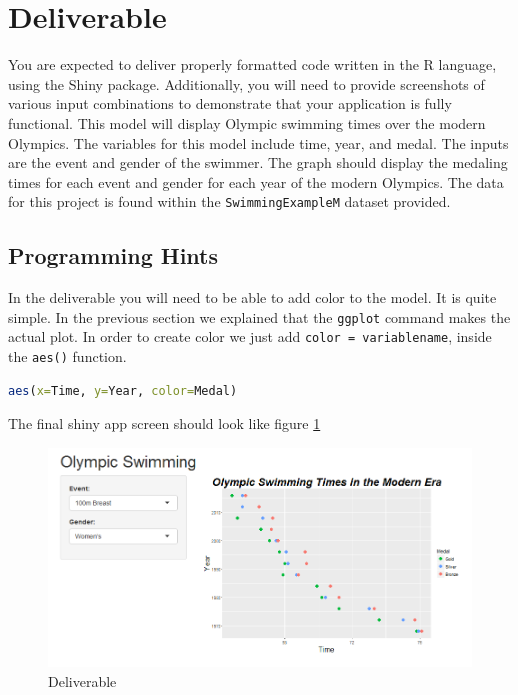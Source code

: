 \section{Deliverable}

You are expected to deliver properly formatted code written in the R language, using the Shiny package.
Additionally, you will need to provide screenshots of various input combinations to demonstrate that your application is fully functional.
This model will display Olympic swimming times over the modern Olympics.
The variables for this model include time, year, and medal.
The inputs are the event and gender of the swimmer.
The graph should display the medaling times for each event and gender for each year of the modern Olympics.
The data for this project is found within the \texttt{SwimmingExampleM} dataset provided. 
\subsection{Programming Hints}
In the deliverable you will need to be able to add color to the model.
It is quite simple.
In the previous section we explained that the \texttt{ggplot} command makes the actual plot.
In order to create color we just add \texttt{color = variablename}, inside the \texttt{aes()} function.

\begin{lstlisting}[language = R]
aes(x=Time, y=Year, color=Medal)
\end{lstlisting}
The final shiny app screen should look like figure \ref{fig:olympic}
\begin{figure}[h]
   \centering
   \includegraphics[width = .5\textwidth]{pictures/shiny/olympic.PNG} 
   \caption{Deliverable}
   \label{fig:olympic}
\end{figure}

